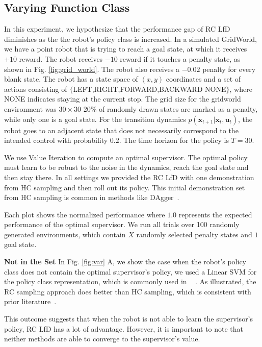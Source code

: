 \documentclass[10pt, conference]{ieeeconf}      %
\newcommand{\bu}{\mathbf{u}}
\newcommand{\bx}{\mathbf{x}}
\begin{document}
\subsection{Varying Function Class}\label{sec:gdw}
In this experiment, we hypothesize that the performance gap of RC LfD diminishes as the the robot's policy class is increased. In a simulated GridWorld, we have a point robot that is trying to reach a goal state, at which it receives $+10$ reward. The robot receives $-10$ reward if it touches a penalty state, as shown in Fig. \ref{fig:grid_world}. The robot also receives a $-0.02$ penalty for every blank state. The robot has a state space of $(x,y)$ coordinates and a set of actions consisting of $\lbrace$LEFT,RIGHT,FORWARD,BACKWARD NONE$\rbrace$, where NONE indicates staying at the current stop. The grid size for the gridworld environment was $30 \times 30$ $20\%$ of randomly drawn states are marked as a penalty, while only one is a goal state. For the transition dynamics $p(\bx_{t+1}|\bx_{t},\bu_t)$, the robot goes to an adjacent state that does not necessarily correspond to the intended control with probability $0.2$.  The time horizon for the policy is $T=30$. 

We use Value Iteration to compute an optimal supervisor. The optimal policy must learn to be robust to the noise in the dynamics, reach the goal state and then stay there. In all settings we provided the RC LfD with one demonstration from HC sampling and then roll out its policy. This initial demonstration set from HC sampling is common in methods like DAgger~\cite{rossreduction2010}.

Each plot shows the normalized performance where $1.0$ represents the expected performance of the optimal supervisor. We run all trials over 100 randomly generated environments, which contain $X$ randomly selected penalty states and $1$ goal state. 


\noindent \textbf{Not in the Set} In Fig. \ref{fig:var} A, we show the case when the robot's policy class does not contain the optimal supervisor's policy, we used a Linear SVM for the policy class representation, which is commonly used in ~\cite{ross2010efficient,ross2010reduction,ross2013learning} . As illustrated, the RC sampling approach does better than HC sampling, which is consistent with prior literature~\cite{ross2010efficient,ross2010reduction}.

This outcome suggests that when the robot is not able to learn the supervisor's policy, RC LfD has a lot of advantage. However, it is important to note that neither methods are able to converge to the supervisor's value. 
\end{document}
